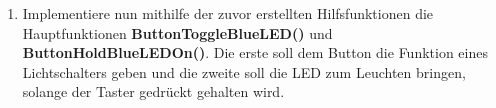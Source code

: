 \begin{enumerate}
\item
Implementiere nun mithilfe der zuvor erstellten Hilfsfunktionen die Hauptfunktionen \textbf{ButtonToggleBlueLED()} und \textbf{ButtonHoldBlueLEDOn()}.
Die erste soll dem Button die Funktion eines Lichtschalters geben und die zweite soll die LED zum Leuchten bringen, solange der Taster gedrückt gehalten wird. 

\end{enumerate}
